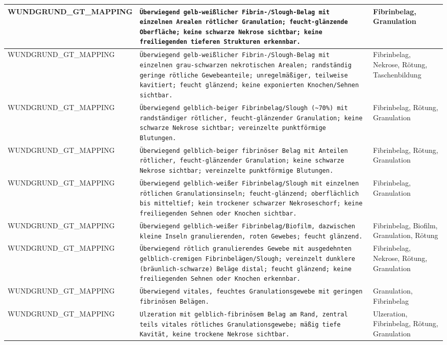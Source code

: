 \begin{longtable}{|p{3.5cm}|p{5cm}|p{6.5cm}|}
WUNDGRUND\_GT\_MAPPING & \texttt{Überwiegend gelb-weißlicher Fibrin-/Slough-Belag mit einzelnen Arealen rötlicher Granulation; feucht-glänzende Oberfläche; keine schwarze Nekrose sichtbar; keine freiliegenden tieferen Strukturen erkennbar.} & Fibrinbelag, Granulation \\ \hline
WUNDGRUND\_GT\_MAPPING & \texttt{Überwiegend gelb-weißlicher Fibrin-/Slough-Belag mit einzelnen grau-schwarzen nekrotischen Arealen; randständig geringe rötliche Gewebeanteile; unregelmäßiger, teilweise kavitiert; feucht glänzend; keine exponierten Knochen/Sehnen sichtbar.} & Fibrinbelag, Nekrose, Rötung, Taschenbildung \\ \hline
WUNDGRUND\_GT\_MAPPING & \texttt{Überwiegend gelblich-beiger Fibrinbelag/Slough (\textasciitilde{}70\%) mit randständiger rötlicher, feucht-glänzender Granulation; keine schwarze Nekrose sichtbar; vereinzelte punktförmige Blutungen.} & Fibrinbelag, Rötung, Granulation \\ \hline
WUNDGRUND\_GT\_MAPPING & \texttt{Überwiegend gelblich-beiger fibrinöser Belag mit Anteilen rötlicher, feucht-glänzender Granulation; keine schwarze Nekrose sichtbar; vereinzelte punktförmige Blutungen.} & Fibrinbelag, Rötung, Granulation \\ \hline
WUNDGRUND\_GT\_MAPPING & \texttt{Überwiegend gelblich-weißer Fibrinbelag/Slough mit einzelnen rötlichen Granulationsinseln; feucht-glänzend; oberflächlich bis mitteltief; kein trockener schwarzer Nekroseschorf; keine freiliegenden Sehnen oder Knochen sichtbar.} & Fibrinbelag, Granulation \\ \hline
WUNDGRUND\_GT\_MAPPING & \texttt{Überwiegend gelblich-weißer Fibrinbelag/Biofilm, dazwischen kleine Inseln granulierenden, roten Gewebes; feucht glänzend.} & Fibrinbelag, Biofilm, Granulation, Rötung \\ \hline
WUNDGRUND\_GT\_MAPPING & \texttt{Überwiegend rötlich granulierendes Gewebe mit ausgedehnten gelblich-cremigen Fibrinbelägen/Slough; vereinzelt dunklere (bräunlich-schwarze) Beläge distal; feucht glänzend; keine freiliegenden Sehnen oder Knochen erkennbar.} & Fibrinbelag, Nekrose, Rötung, Granulation \\ \hline
WUNDGRUND\_GT\_MAPPING & \texttt{Überwiegend vitales, feuchtes Granulationsgewebe mit geringen fibrinösen Belägen.} & Granulation, Fibrinbelag \\ \hline
WUNDGRUND\_GT\_MAPPING & \texttt{Ulzeration mit gelblich-fibrinösem Belag am Rand, zentral teils vitales rötliches Granulationsgewebe; mäßig tiefe Kavität, keine trockene Nekrose sichtbar.} & Ulzeration, Fibrinbelag, Rötung, Granulation \\ \hline

\end{longtable}
